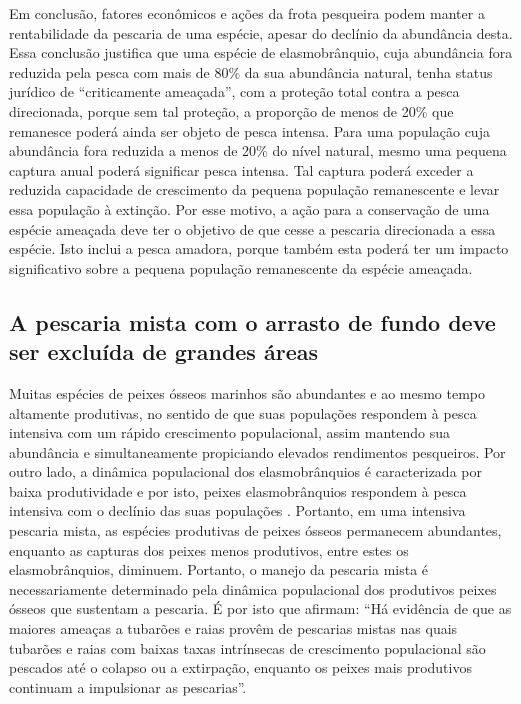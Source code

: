 \documentclass[a4paper,11pt,twoside,showtrims,onecolumn,openright,final]{memoir}
\begin{document}
Em conclusão, fatores econômicos e ações da frota pesqueira podem manter a rentabilidade da pescaria de 
uma espécie, apesar do declínio da abundância desta. Essa conclusão justifica que uma espécie de elasmobrânquio, 
cuja abundância fora  reduzida pela pesca com mais de 80\% da sua abundância natural, tenha  status 
jurídico de ``criticamente ameaçada'', com a proteção total contra a pesca direcionada, porque sem tal 
proteção, a proporção de menos de 20\% que remanesce poderá ainda ser objeto de pesca intensa. 
Para uma população cuja abundância fora reduzida a menos de 20\% do nível natural, mesmo uma pequena 
captura anual poderá significar pesca intensa. Tal captura poderá exceder a reduzida capacidade de 
crescimento da pequena população remanescente e levar essa população à extinção. Por esse motivo, a ação 
para a conservação de uma espécie ameaçada deve ter o objetivo de que cesse  a pescaria direcionada 
a essa espécie. Isto inclui a pesca amadora, porque também esta poderá ter um impacto significativo sobre 
a pequena população remanescente da espécie ameaçada.

\subsection*{A pescaria  mista com o arrasto de fundo deve ser excluída de grandes áreas}

Muitas espécies de peixes ósseos marinhos são abundantes e ao mesmo tempo altamente produtivas, 
no sentido de que suas populações respondem à pesca intensiva com um rápido crescimento populacional, 
assim mantendo sua abundância e simultaneamente propiciando elevados rendimentos pesqueiros. 
Por outro lado, a dinâmica populacional dos elasmobrânquios é caracterizada por baixa produtividade 
e por isto, peixes elasmobrânquios respondem à pesca intensiva com 
o declínio das suas populações \citep{musick2004}. %
Portanto, em uma intensiva pescaria mista, as espécies produtivas de peixes ósseos permanecem 
abundantes, enquanto as capturas dos 
peixes menos produtivos, entre estes os elasmobrânquios, diminuem. Portanto, o manejo da pescaria 
mista é necessariamente determinado pela dinâmica populacional dos produtivos peixes ósseos 
que sustentam a pescaria. É por isto que \citet[p. 9, tradução dos autores]{musick2000b} %
afirmam: ``Há evidência de que as maiores ameaças a tubarões e raias provêm de pescarias mistas 
nas quais tubarões e raias com baixas taxas intrínsecas de crescimento populacional são pescados 
até o colapso ou a extirpação, enquanto os peixes mais produtivos continuam a impulsionar as pescarias''.
\end{document}
